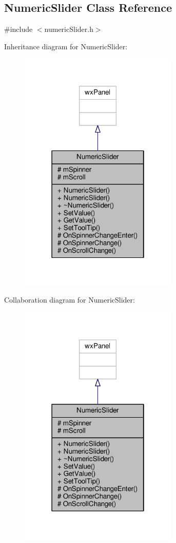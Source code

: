 \subsection{Numeric\+Slider Class Reference}
\label{classNumericSlider}


{\ttfamily \#include $<$numeric\+Slider.\+h$>$}



Inheritance diagram for Numeric\+Slider\+:
\nopagebreak
\begin{figure}[H]
\begin{center}
\leavevmode
\includegraphics[width=214pt]{d8/d7d/classNumericSlider__inherit__graph}
\end{center}
\end{figure}


Collaboration diagram for Numeric\+Slider\+:
\nopagebreak
\begin{figure}[H]
\begin{center}
\leavevmode
\includegraphics[width=214pt]{d0/d30/classNumericSlider__coll__graph}
\end{center}
\end{figure}
